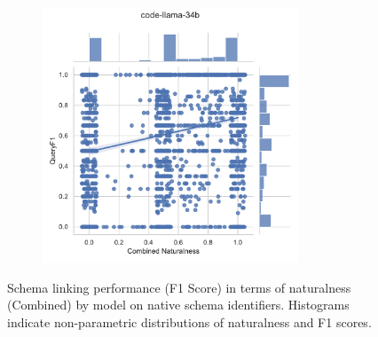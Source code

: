 \begin{figure}
\begin{subfigure}{.5\textwidth}
    \end{subfigure}%
    \begin{subfigure}{.5\textwidth}
      \centering
      \includegraphics[height=3in]{figures/distribution-jointplots/jointplot-code-llama-34b-combined-nat--f1-with-distributions.pdf}
    \end{subfigure}
    \caption{Schema linking performance (F1 Score) in terms of naturalness (Combined) by model on native schema identifiers. Histograms indicate non-parametric distributions of naturalness and F1 scores.}
    \label{fig:distribution-jointplot-native-f1}
  \end{figure}
  
